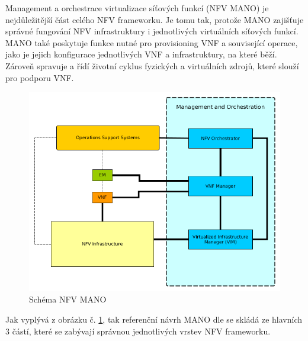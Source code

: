 Management a orchestrace virtualizace síťových funkcí (NFV MANO) je nejdůležitější část celého NFV frameworku. Je tomu tak, protože MANO zajišťuje správné fungování NFV infrastruktury i jednotlivých virtuálních síťových funkcí. MANO také poskytuje funkce nutné pro provisioning VNF a související operace, jako je jejich konfigurace jednotlivých VNF a infrastruktury, na které běží. Zároveň spravuje a řídí životní cyklus fyzických a virtuálních zdrojů, které slouží pro podporu VNF. 

\begin{figure}[h]
\begin{centering}
\includegraphics[scale=0.65]{images/MANO}
\par\end{centering}
\caption{Schéma NFV MANO\label{fig:MANO}}
\end{figure}

Jak vyplývá z obrázku č. \ref{fig:MANO}, tak referenční návrh MANO dle \cite{NFV_MANO} se skládá ze hlavních 3 částí, které se zabývají správnou jednotlivých vrstev NFV frameworku.

